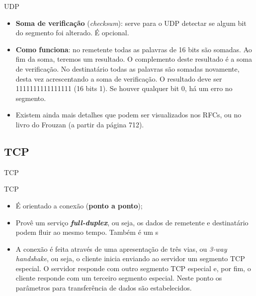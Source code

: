 \documentclass{libs/ufc_format}
\begin{document}
\begin{frame}{UDP}
    \begin{itemize}
        \justifying
        \item \textbf{Soma de verificação} (\textit{checksum}): serve para o UDP detectar se algum bit do segmento foi alterado. É opcional.
        \item \textbf{Como funciona}: no remetente todas as palavras de 16 bits são somadas. Ao fim da soma, teremos um resultado. O complemento deste resultado é a soma de verificação. No destinatário todas as palavras são somadas novamente, desta vez acrescentando a soma de verificação. O resultado deve ser 1111111111111111 (16 bits 1). Se houver qualquer bit 0, há um erro no segmento.
        \item Existem ainda mais detalhes que podem ser visualizados nos RFCs, ou no livro do Frouzan (a partir da página 712).
    \end{itemize}
\end{frame}

\subsection{TCP}

\begin{frame}{}
    \centering
    \Large
    TCP
\end{frame}

\begin{frame}{TCP}
    \begin{itemize}
        \justifying
        \item É orientado a conexão (\textbf{ponto a ponto});
        \item Provê um serviço \textbf{\textit{full-duplex}}, ou seja, os dados de remetente e destinatário podem fluir ao mesmo tempo. Também é um s
        \item A conexão é feita através de uma apresentação de três vias, ou \textit{3-way handshake}, ou seja, o cliente inicia enviando ao servidor um segmento TCP especial. O servidor responde com outro segmento TCP especial e, por fim, o cliente responde com um terceiro segmento especial. Neste ponto os parâmetros para transferência de dados são estabelecidos.
    \end{itemize}
\end{frame}
\end{document}
